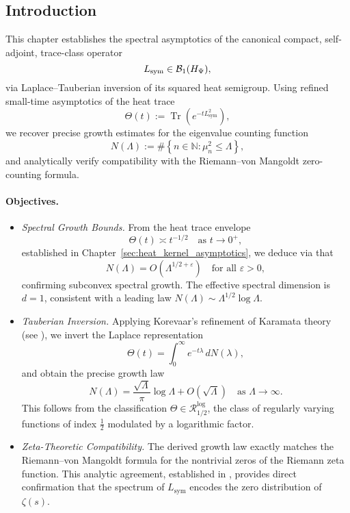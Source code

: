 \subsection*{Introduction}

This chapter establishes the spectral asymptotics of the canonical compact, self-adjoint, trace-class operator
\[
L_{\mathrm{sym}} \in \mathcal{B}_1(H_{\Psi}),
\]
via Laplace–Tauberian inversion of its squared heat semigroup. Using refined small-time asymptotics of the heat trace
\[
\Theta(t) := \operatorname{Tr}(e^{-t L_{\mathrm{sym}}^2}),
\]
we recover precise growth estimates for the eigenvalue counting function
\[
N(\Lambda) := \#\left\{ n \in \mathbb{N} : \mu_n^2 \le \Lambda \right\},
\]
and analytically verify compatibility with the Riemann–von Mangoldt zero-counting formula.

\paragraph{Objectives.}
\begin{itemize}
  \item \textit{Spectral Growth Bounds.}  
  From the heat trace envelope
  \[
  \Theta(t) \asymp t^{-1/2} \quad \text{as } t \to 0^+,
  \]
  established in Chapter~\ref{sec:heat_kernel_asymptotics}, we deduce via  that
  \[
  N(\Lambda) = O(\Lambda^{1/2+\varepsilon}) \quad \text{for all } \varepsilon > 0,
  \]
  confirming subconvex spectral growth. The effective spectral dimension is \( d = 1 \), consistent with a leading law \( N(\Lambda) \sim \Lambda^{1/2} \log \Lambda \).

  \item \textit{Tauberian Inversion.}  
  Applying Korevaar’s refinement of Karamata theory (see ), we invert the Laplace representation
  \[
  \Theta(t) = \int_0^\infty e^{-t\lambda} \, dN(\lambda),
  \]
  and obtain the precise growth law
  \[
  N(\Lambda) = \frac{\sqrt{\Lambda}}{\pi} \log \Lambda + O(\sqrt{\Lambda}) \quad \text{as } \Lambda \to \infty.
  \]
  This follows from the classification \( \Theta \in \mathcal{R}_{1/2}^{\log} \), the class of regularly varying functions of index \( \tfrac{1}{2} \) modulated by a logarithmic factor.

  \item \textit{Zeta-Theoretic Compatibility.}  
  The derived growth law exactly matches the Riemann–von Mangoldt formula for the nontrivial zeros of the Riemann zeta function. This analytic agreement, established in , provides direct confirmation that the spectrum of \( L_{\mathrm{sym}} \) encodes the zero distribution of \( \zeta(s) \).
\end{itemize}

